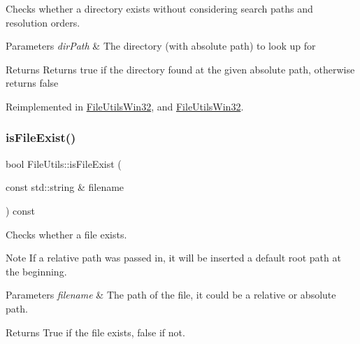 Checks whether a directory exists without considering search paths and resolution orders. 
\begin{DoxyParams}{Parameters}
{\em dir\+Path} & The directory (with absolute path) to look up for \\
\hline
\end{DoxyParams}
\begin{DoxyReturn}{Returns}
Returns true if the directory found at the given absolute path, otherwise returns false 
\end{DoxyReturn}


Reimplemented in \hyperlink{classFileUtilsWin32_aaeab26cde3a9a4cf3e4f8367d20f0e08}{File\+Utils\+Win32}, and \hyperlink{classFileUtilsWin32_a9a408c75230da1289e5619285dd00f67}{File\+Utils\+Win32}.

\mbox{\label{classFileUtils_a4e849a9b77e09971c4d8b879a5243eb3}} 
\subsubsection{\texorpdfstring{is\+File\+Exist()}{isFileExist()}\hspace{0.1cm}{\footnotesize\ttfamily [1/3]}}
{\footnotesize\ttfamily bool File\+Utils\+::is\+File\+Exist (\begin{DoxyParamCaption}\item[{const std\+::string \&}]{filename }\end{DoxyParamCaption}) const\hspace{0.3cm}{\ttfamily [virtual]}}

Checks whether a file exists.

\begin{DoxyNote}{Note}
If a relative path was passed in, it will be inserted a default root path at the beginning. 
\end{DoxyNote}

\begin{DoxyParams}{Parameters}
{\em filename} & The path of the file, it could be a relative or absolute path. \\
\hline
\end{DoxyParams}
\begin{DoxyReturn}{Returns}
True if the file exists, false if not. 
\end{DoxyReturn}
\mbox{\label{classFileUtils_a53eb44abd5db36aeb91ef29174077c8f}} 
